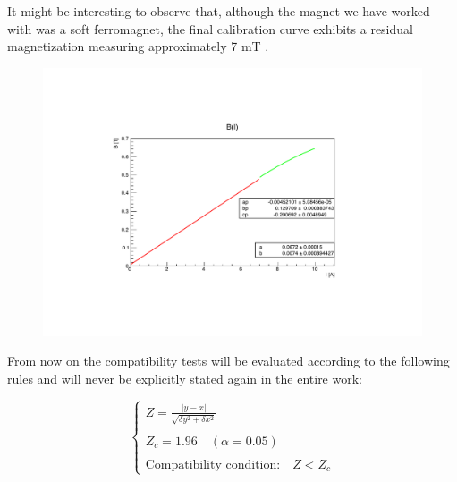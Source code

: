 \documentclass[a4paper,12pt,abstracton]{scrartcl}
\begin{document}
It might be interesting to observe that, although the magnet we have worked with was a soft ferromagnet, the final calibration curve exhibits a residual magnetization measuring approximately 7 mT . 

\begin{figure}[H]
    \centering
    \includegraphics[scale=0.8]{plots/curva.pdf}
    \caption{}
    \label{fig:calcurve}
\end{figure}
From now on the compatibility tests will be evaluated according to the following rules and will never be explicitly stated again in the entire work: 

$$\begin{cases}
Z=\frac{|y-x|}{\sqrt{\delta y^2+ \delta x^2}} \\\\
Z_c = 1.96 \quad(\alpha=0.05) \\\\
\text{Compatibility condition:}\quad Z < Z_c
\end{cases}
$$
\end{document}
